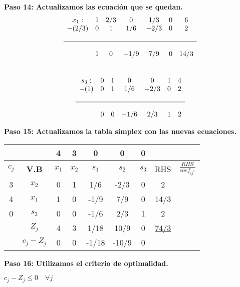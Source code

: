 \documentclass{templateNote}
\begin{document}
\textbf{Paso 14: Actualizamos las ecuación que se quedan.}
\begin{equation*}
    \begin{array}{ccccccc}
        x_1: & 1 & 2/3 & 0 & 1/3 & 0 & 6 \\
        -(2/3) & 0 & 1 & 1/6 & -2/3 & 0 & 2 \\
        \\ \hline \\
        & 1 & 0 & -1/9 & 7/9 & 0 & 14/3 
    \end{array}
\end{equation*}
\\
\begin{equation*}
    \begin{array}{ccccccc}
        s_3: & 0 & 1 & 0 & 0 & 1 & 4 \\
        -(1) & 0 & 1 & 1/6 & -2/3 & 0 & 2 \\
        \\ \hline \\
        & 0 & 0 & -1/6 & 2/3 & 1 & 2
    \end{array}
\end{equation*}

\textbf{Paso 15: Actualizamos la tabla simplex con las nuevas ecuaciones.}
\begin{center}
    \begin{tabular}{|c|c|c|c|c|c|c|c|c|}
        \hline
        & & 4 & 3 & 0 & 0 & 0 &  &  \\ \hline
        $c_j$ & \textbf{V.B} & $x_1$ & $x_2$ & $s_1$ & $s_2$ & $s_3$ & RHS & $\displaystyle\frac{RHS}{coef_{ij^*}}$ \\ \hline
        3 & $x_2$ & 0 & 1 & 1/6 & -2/3 & 0 & 2 & \\ \hline
        4 & $x_1$ & 1 & 0 & -1/9 & 7/9 & 0 & 14/3 & \\ \hline
        0 & $s_3$ & 0 & 0 & -1/6 & 2/3 & 1 & 2 & \\ \hline
        & $Z_j$ & 4 & 3 & 1/18 & 10/9 & 0 & \underline{74/3} &  \\ \hline
        & $c_j - Z_j$ & 0 & 0 & -1/18 & -10/9 & 0 &  &  \\ \hline
    \end{tabular}
\end{center}

\newpage
\textbf{Paso 16: Utilizamos el criterio de optimalidad.}
\begin{center}
    $c_j - Z_j \leq 0 \quad \forall j$
\end{center}
\end{document}
